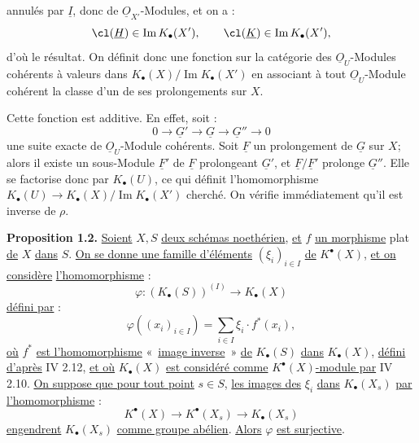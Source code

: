 
annulés par $\underline{I}$, donc de $\underline{O}_{X'}$-Modules, et on a :
\[
\cl(\underline{H})\in \operatorname{Im}K_\bullet(X'),\qquad
\cl(\underline{K})\in \operatorname{Im}K_\bullet(X'),
\]
d'où le résultat. On définit donc une fonction sur la catégorie des $\underline{O}_U$-Modules cohérents à valeurs dans $K_\bullet(X)/\operatorname{Im}K_\bullet(X')$ en associant à tout $\underline{O}_U$-Module cohérent la classe d'un de ses prolongements sur $X$.

Cette fonction est additive. En effet, soit :
\[
0\longrightarrow \underline{G}'\longrightarrow \underline{G}\longrightarrow \underline{G}''\longrightarrow 0
\]
une suite exacte de $\underline{O}_U$-Module cohérents. Soit $\underline{F}$ un prolongement de $\underline{G}$ sur $X$; alors il existe un sous-Module $\underline{F}'$ de $\underline{F}$ prolongeant $\underline{G}'$, et $\underline{F}/\underline{F}'$ prolonge $\underline{G}''$. Elle se factorise donc par $K_\bullet(U)$, ce qui définit l'homomorphisme $K_\bullet(U)\to K_\bullet(X)/\operatorname{Im}K_\bullet(X')$ cherché. On vérifie immédiatement qu'il est inverse de $\rho$.

\textbf{Proposition 1.2.} \uline{Soient} $X,S$ \uline{deux schémas noethérien}, \uline{et} $f$ \uline{un morphisme} plat \uline{de} $X$ \uline{dans} $S$. \uline{On se donne une famille d'éléments} $(\xi_i)_{i\in I}$ \uline{de} $K^{\bullet}(X)$, \uline{et on considère} \uline{l'homomorphisme} :
\[
\varphi:(K_\bullet(S))^{(I)}\longrightarrow K_\bullet(X)
\]
\uline{défini par} :
\[
\varphi((x_i)_{i\in I})=\sum_{i\in I}\xi_i\cdot f^*(x_i),
\]
\uline{où} $f^*$ \uline{est l'homomorphisme} «~\uline{image inverse}~» \uline{de} $K_\bullet(S)$ \uline{dans} $K_\bullet(X)$, \uline{défini d'après} IV 2.12, \uline{et où} $K_\bullet(X)$ \uline{est considéré comme} $K^{\bullet}(X)$\uline{-module par} IV 2.10. \uline{On suppose que pour tout point} $s\in S$, \uline{les images des} $\xi_i$ \uline{dans} $K_\bullet(X_s)$ \uline{par} \uline{l'homomorphisme} :
\[
K^{\bullet}(X)\longrightarrow K^{\bullet}(X_s)\longrightarrow K_\bullet(X_s)
\]
\uline{engendrent} $K_\bullet(X_s)$ \uline{comme groupe abélien}. \uline{Alors} $\varphi$ \uline{est surjective}.

